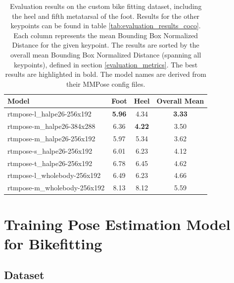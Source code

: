 \begin{table}[htbp]
    \centering
    \begin{tabular}{lccc}
        \toprule
        \textbf{Model}               & \textbf{Foot} & \textbf{Heel} & \textbf{Overall Mean} \\

        \midrule
        rtmpose-l\_halpe26-256x192   & \textbf{5.96} & 4.34          & \textbf{3.33}         \\
        rtmpose-m\_halpe26-384x288   & 6.36          & \textbf{4.22} & 3.50                  \\
        rtmpose-m\_halpe26-256x192   & 5.97          & 5.34          & 3.62                  \\
        rtmpose-s\_halpe26-256x192   & 6.01          & 6.23          & 4.12                  \\
        rtmpose-t\_halpe26-256x192   & 6.78          & 6.45          & 4.62                  \\
        rtmpose-l\_wholebody-256x192 & 6.49          & 6.23          & 4.66                  \\
        rtmpose-m\_wholebody-256x192 & 8.13          & 8.12          & 5.59                  \\
        \bottomrule
    \end{tabular}
    \caption{Evaluation results on the custom bike fitting dataset, including the heel and fifth metatarsal of the foot. Results for the other keypoints can be found in table \ref{tab:evaluation_results_coco}. Each column represents the mean Bounding Box Normalized Distance for the given keypoint. The results are sorted by the overall mean Bounding Box Normalized Distance (spanning all keypoints), defined in section \ref{evaluation_metrics}. The best results are highlighted in bold. The model names are derived from their MMPose config files.}
    \label{tab:evaluation_results_wholebody}

\end{table}




\chapter{Training Pose Estimation Model for Bikefitting}
\label{training_pose_estimation_model_for_bikefitting}

\section{Dataset}
